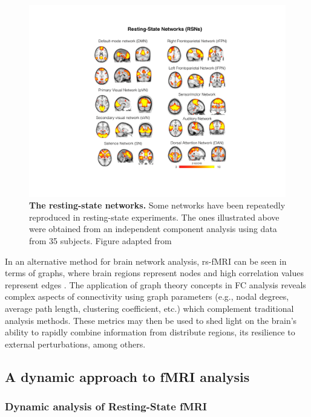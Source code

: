 \begin{figure}[h!]
\centering\includegraphics[width=0.9\linewidth]{images/Ch2/Ch2_RSN.pdf}
\caption{\textbf{The resting-state networks.} Some networks have been repeatedly reproduced in resting-state experiments. The ones illustrated above were obtained from an independent component analysis using data from 35 subjects. Figure adapted from \citet{Akbar2016}  } \label{fig:RSN}
\end{figure}





In an alternative method for brain network analysis, rs-fMRI can be seen in terms of graphs, where brain regions represent nodes and high correlation values represent edges \citep{Rubinov2010, Farahani2019}. The application of graph theory concepts in FC analysis reveals complex aspects of connectivity using graph parameters (e.g., nodal degrees, average path length, clustering coefficient, etc.) which complement traditional analysis methods. These metrics may then be used to shed light on the brain's ability to rapidly combine information from distribute regions, its resilience to external perturbations, among others.

\subsection{A dynamic approach to fMRI analysis}

\subsubsection{Dynamic analysis of Resting-State fMRI}


